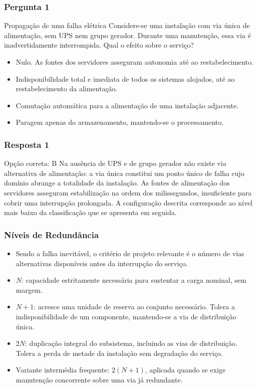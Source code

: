 \documentclass[aspectratio=169]{beamer}
\begin{document}
\begin{frame}
\frametitle{Pergunta 1}
\begin{pergunta}{Propagação de uma falha elétrica}
Considere-se uma instalação com via única de alimentação, sem UPS nem grupo gerador. Durante uma manutenção, essa via é inadvertidamente interrompida. Qual o efeito sobre o serviço?
\begin{itemize}
    \item[A)] Nulo. As fontes dos servidores asseguram autonomia até ao restabelecimento.
    \item[B)] Indisponibilidade total e imediata de todos os sistemas alojados, até ao restabelecimento da alimentação.
    \item[C)] Comutação automática para a alimentação de uma instalação adjacente.
    \item[D)] Paragem apenas do armazenamento, mantendo-se o processamento.
\end{itemize}
\end{pergunta}
\end{frame}

\begin{frame}
\frametitle{Resposta 1}
\begin{resposta}{Opção correta: B}
Na ausência de UPS e de grupo gerador não existe via alternativa de alimentação: a via única constitui um ponto único de falha cujo domínio abrange a totalidade da instalação. As fontes de alimentação dos servidores asseguram estabilização na ordem dos milissegundos, insuficiente para cobrir uma interrupção prolongada. A configuração descrita corresponde ao nível mais baixo da classificação que se apresenta em seguida.
\end{resposta}
\end{frame}

\begin{frame}
\frametitle{Níveis de Redundância}
\begin{itemize}
    \setlength\itemsep{0.4cm}
    \item Sendo a falha inevitável, o critério de projeto relevante é o número de vias alternativas disponíveis antes da interrupção do serviço.
    \item \textbf{$N$}: capacidade estritamente necessária para sustentar a carga nominal, sem margem.
    \item \textbf{$N+1$}: acresce uma unidade de reserva ao conjunto necessário. Tolera a indisponibilidade de um componente, mantendo-se a via de distribuição única.
    \item \textbf{$2N$}: duplicação integral do subsistema, incluindo as vias de distribuição. Tolera a perda de metade da instalação sem degradação do serviço.
    \item Variante intermédia frequente: \textbf{$2(N+1)$}, aplicada quando se exige manutenção concorrente sobre uma via já redundante.
\end{itemize}
\end{frame}
\end{document}

